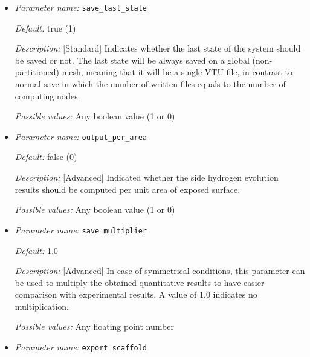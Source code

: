 \begin{itemize}
{\it Description:} [Standard] The interval of saving results, text and VTK (if selected), to disk. 

{\it Possible values:} Any floating point number


\item {\it Parameter name:} {\tt save\_last\_state}
\label{parameters:save_last_state}


{\it Default:} true (1)

{\it Description:} [Standard] Indicates whether the last state of the system should be saved or not. The last state will be always saved on a global (non-partitioned) mesh, meaning that it will be a single VTU file, in contrast to normal save in which the number of written files equals to the number of computing nodes.

{\it Possible values:} Any boolean value (1 or 0)


\item {\it Parameter name:} {\tt output\_per\_area}
\label{parameters:output_per_area}


{\it Default:} false (0)

{\it Description:} [Advanced] Indicated whether the side hydrogen evolution results should be computed per unit area of exposed surface.

{\it Possible values:} Any boolean value (1 or 0)


\item {\it Parameter name:} {\tt save\_multiplier}
\label{parameters:save_multiplier}


{\it Default:} 1.0

{\it Description:} [Advanced] In case of symmetrical conditions, this parameter can be used to multiply the obtained quantitative results to have easier comparison with experimental results. A value of 1.0 indicates no multiplication.

{\it Possible values:} Any floating point number


\item {\it Parameter name:} {\tt export\_scaffold}
\label{parameters:export_scaffold}


\end{itemize}
